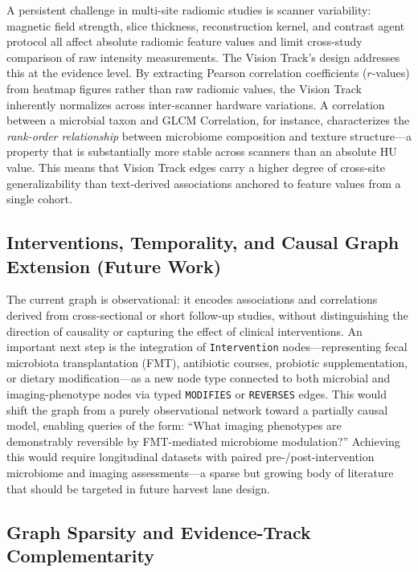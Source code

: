 \documentclass[12pt, letterpaper]{article}
\begin{document}
A persistent challenge in multi-site radiomic studies is scanner variability: magnetic field strength, slice thickness, reconstruction kernel, and contrast agent protocol all affect absolute radiomic feature values and limit cross-study comparison of raw intensity measurements. The Vision Track's design addresses this at the evidence level. By extracting Pearson correlation coefficients ($r$-values) from heatmap figures rather than raw radiomic values, the Vision Track inherently normalizes across inter-scanner hardware variations. A correlation between a microbial taxon and GLCM Correlation, for instance, characterizes the \textit{rank-order relationship} between microbiome composition and texture structure---a property that is substantially more stable across scanners than an absolute HU value. This means that Vision Track edges carry a higher degree of cross-site generalizability than text-derived associations anchored to feature values from a single cohort.

\subsection{Interventions, Temporality, and Causal Graph Extension (Future Work)}

The current graph is observational: it encodes associations and correlations derived from cross-sectional or short follow-up studies, without distinguishing the direction of causality or capturing the effect of clinical interventions. An important next step is the integration of \texttt{Intervention} nodes---representing fecal microbiota transplantation (FMT), antibiotic courses, probiotic supplementation, or dietary modification---as a new node type connected to both microbial and imaging-phenotype nodes via typed \texttt{MODIFIES} or \texttt{REVERSES} edges. This would shift the graph from a purely observational network toward a partially causal model, enabling queries of the form: ``What imaging phenotypes are demonstrably reversible by FMT-mediated microbiome modulation?'' Achieving this would require longitudinal datasets with paired pre-/post-intervention microbiome and imaging assessments---a sparse but growing body of literature that should be targeted in future harvest lane design.

\subsection{Graph Sparsity and Evidence-Track Complementarity}
\end{document}
